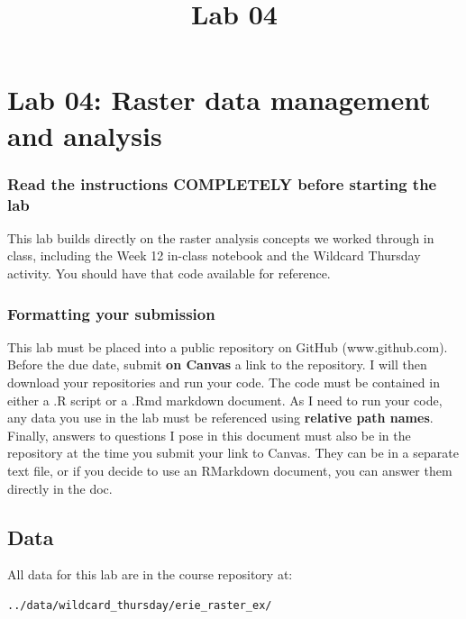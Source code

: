 \documentclass[
]{article}
\title{Lab 04}
\author{}
\date{\vspace{-2.5em}}
\begin{document}
\maketitle

\section{Lab 04: Raster data management and
analysis}\label{lab-04-raster-data-management-and-analysis}

\subsubsection{Read the instructions COMPLETELY before starting the
lab}\label{read-the-instructions-completely-before-starting-the-lab}

This lab builds directly on the raster analysis concepts we worked
through in class, including the Week 12 in-class notebook and the
Wildcard Thursday activity. You should have that code available for
reference.

\subsubsection{Formatting your
submission}\label{formatting-your-submission}

This lab must be placed into a public repository on GitHub
(www.github.com). Before the due date, submit \textbf{on Canvas} a link
to the repository. I will then download your repositories and run your
code. The code must be contained in either a .R script or a .Rmd
markdown document. As I need to run your code, any data you use in the
lab must be referenced using \textbf{relative path names}. Finally,
answers to questions I pose in this document must also be in the
repository at the time you submit your link to Canvas. They can be in a
separate text file, or if you decide to use an RMarkdown document, you
can answer them directly in the doc.

\subsection{Data}\label{data}

All data for this lab are in the course repository at:

\begin{verbatim}
../data/wildcard_thursday/erie_raster_ex/
\end{verbatim}
\end{document}
